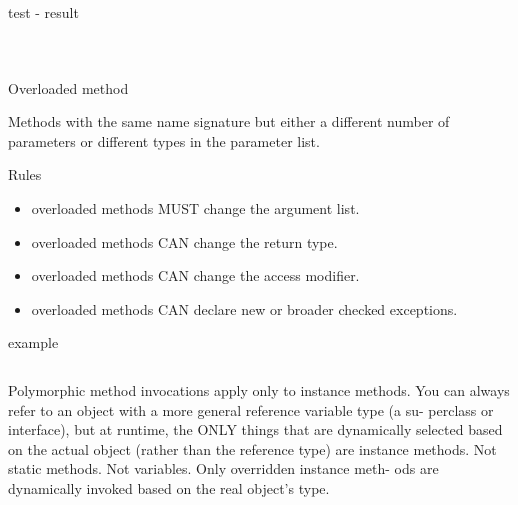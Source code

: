 \documentclass[a4paper, 11pt]{beamer}
\begin{document}
\begin{frame}{test - result}

\begin{columns}
    \begin{column}{.3\linewidth}
      \inputminted[bgcolor=bg, fontsize=\tiny]{java}{./src/overriding/Polygon4.java}        
    \end{column}
\vline
    \begin{column}{.5\linewidth}
       \inputminted[bgcolor=bg, fontsize=\tiny]{java}{./src/overriding/Polygon4TestFail.java}
   
    \end{column}
  \end{columns}
\end{frame}

\begin{frame}{Overloaded method}

Methods with the same name signature but either a different number of parameters or different types in the parameter list.

\end{frame}


\begin{frame}{Rules}

\begin{itemize}
\item overloaded methods MUST change the argument list.
\item overloaded methods CAN change the return type.
\item overloaded methods CAN change the access modifier.
\item overloaded methods CAN declare new or broader checked exceptions.

\end{itemize}


\end{frame}

\begin{frame}{example}
\inputminted[bgcolor=bg, fontsize=\tiny]{java}{./src/overloading/Polygon3.java}
\end{frame}

\begin{frame}
Polymorphic method invocations apply only to instance methods. You can
always refer to an object with a more general reference variable type (a su-
perclass or interface), but at runtime, the ONLY things that are dynamically
selected based on the actual object (rather than the reference type) are instance
methods. Not static methods. Not variables. Only overridden instance meth-
ods are dynamically invoked based on the real object's type.


\end{frame}
\end{document}
